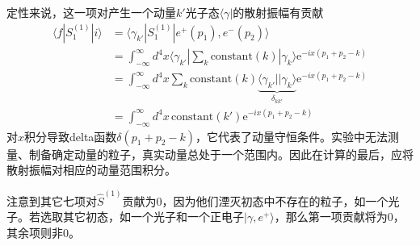 定性来说，这一项对产生一个动量$k'$光子态$\langle \gamma|$的散射振幅有贡献
\begin{align}\label{equ9.74}
\langle f|S^{(1)}_1|i\rangle &= \langle \gamma_{k'}|S^{(1)}_1|e^+(p_1),e^-(p_2)\rangle\\
&=\int_{-\infty}^\infty d^4x\langle\gamma_{k'}|\sum_k\text{constant}(k)|\gamma_k\rangle \text{e}^{-ix(p_1+p_2-k)}\nonumber\\
&=\int_{-\infty}^\infty d^4x\sum_k\text{constant}(k)\underbrace{\langle\gamma_{k'}||\gamma_k\rangle}_{\delta_{kk'}} \text{e}^{-ix(p_1+p_2-k)}\nonumber\\
&=\int_{-\infty}^{\infty} d^4x\, \text{constant}(k')\text{e}^{-ix(p_1+p_2-k)}\nonumber
\end{align}
对$x$积分导致delta函数$\delta(p_1+p_2-k)$，它代表了动量守恒条件。实验中无法测量、制备确定动量的粒子，真实动量总处于一个范围内。因此在计算的最后，应将散射振幅对相应的动量范围积分。

注意到其它七项对$\hat{S}^(1)$贡献为0，因为他们湮灭初态中不存在的粒子，如一个光子。若选取其它初态，如一个光子和一个正电子$|\gamma,e^+\rangle$，那么第一项贡献将为0，其余项则非0。

